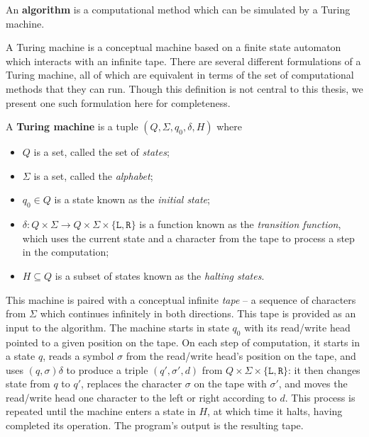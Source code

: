 \begin{definition}
  \label{def:algorithm}
  An \textbf{algorithm} is a computational method which can be simulated by a
  Turing machine.
\end{definition}

A Turing machine is a conceptual machine based on a finite state automaton which
interacts with an infinite tape.  There are several different formulations of a
Turing machine, all of which are equivalent in terms of the set of computational
methods that they can run.  Though this definition is not central to this
thesis, we present one such formulation here for completeness.

\begin{definition}
  \label{def:turing-machine}
  A \textbf{Turing machine} is a tuple $(Q, \Sigma, q_0, \delta, H)$ where
  \begin{itemize}
  \item $Q$ is a set, called the set of \textit{states};
  \item $\Sigma$ is a set, called the \textit{alphabet};
  \item $q_0 \in Q$ is a state known as the \textit{initial state};
  \item $\delta: Q \times \Sigma \to
    Q \times \Sigma \times \{\mathtt{L}, \mathtt{R}\}$
    is a function known as the \textit{transition function}, which uses the
    current state and a character from the tape to process a step in the
    computation;
  \item $H \subseteq Q$ is a subset of states known as the \textit{halting
      states}.
  \end{itemize}
  This machine is paired with a conceptual infinite \textit{tape} -- a
  sequence of characters from $\Sigma$ which continues infinitely in both
  directions.  This tape is provided as an input to the algorithm.  The machine
  starts in state $q_0$ with its read/write head pointed to a given position on
  the tape.  On each step of computation, it starts in a state $q$, reads a
  symbol $\sigma$ from the read/write head's position on the tape, and uses
  $(q, \sigma)\delta$ to produce a triple $(q', \sigma', d)$ from
  $Q \times \Sigma \times \{\mathtt{L},\mathtt{R}\}$:
  it then changes state from $q$ to $q'$,
  replaces the character $\sigma$ on the tape with $\sigma'$, and moves the
  read/write head one character to the left or right according to $d$.  This process is
  repeated until the machine enters a state in $H$, at which time it halts,
  having completed its operation.  The program's output is the resulting tape.
\end{definition}

